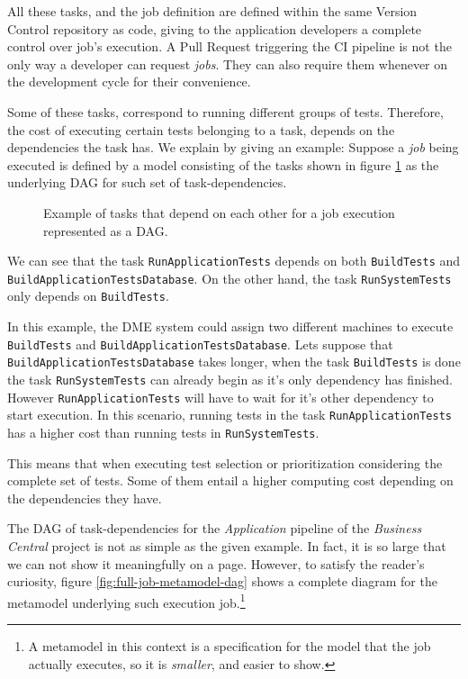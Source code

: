 All these tasks, and the job definition are defined within the same
Version Control repository as code, giving to the application developers a complete 
control over job's execution. A Pull Request triggering the CI pipeline is not the only way 
a developer can request \emph{jobs}. They can also require them whenever on the development 
cycle for their convenience.

Some of these tasks, correspond to running different groups of tests. Therefore, the cost of executing 
certain tests belonging to a task, depends on the dependencies the task has.
We explain by giving an example: Suppose a \emph{job} being executed 
is defined by a model consisting of the tasks shown in figure \ref{fig:example-dag-tasks} as the 
underlying DAG for such set of task-dependencies. 

\begin{figure}
    \def\svgwidth{\columnwidth}
    
    \caption{Example of tasks that depend on each other for a job execution represented as a DAG.}
    \label{fig:example-dag-tasks}
\end{figure}

We can see that the task \texttt{RunApplicationTests} depends on both \texttt{BuildTests}
and \texttt{BuildApplicationTestsDatabase}. On the other hand, the task 
\texttt{RunSystemTests} only depends on \texttt{BuildTests}.

In this example, the DME system could assign two different machines to execute 
\texttt{BuildTests} and \texttt{BuildApplicationTestsDatabase}. Lets suppose that
\texttt{BuildApplicationTestsDatabase} takes longer, when the task \texttt{BuildTests}
is done the task \texttt{RunSystemTests} can already begin as it's only dependency
has finished. However \texttt{RunApplicationTests} will have to wait for it's other
dependency to start execution. In this scenario, running tests in the task \texttt{RunApplicationTests}
has a higher cost than running tests in \texttt{RunSystemTests}.

This means that when executing test selection or prioritization considering the complete
set of tests. Some of them entail a higher computing cost depending on the dependencies they
have.

The DAG of task-dependencies for the \emph{Application} pipeline of the \emph{Business Central} project is not as simple 
as the given example. In fact, it is so large that we can not show it meaningfully on a
page. However, to satisfy the reader's curiosity, figure \ref{fig:full-job-metamodel-dag} 
shows a complete diagram for the metamodel underlying such execution job.\footnote{A 
metamodel in this context is a specification for the model that the job actually executes, so it is \textit{smaller}, and easier to show.}

